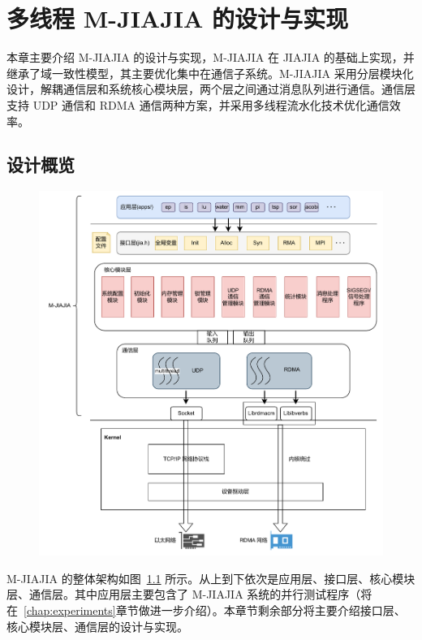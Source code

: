 \chapter{多线程 M-JIAJIA 的设计与实现}\label{chap:MJIAJIA}{
    本章主要介绍 M-JIAJIA 的设计与实现，M-JIAJIA 在 JIAJIA 的基础上实现，并继承了域一致性模型，其主要优化集中在通信子系统。M-JIAJIA 采用分层模块化设计，解耦通信层和系统核心模块层，两个层之间通过消息队列进行通信。通信层支持 UDP 通信和 RDMA 通信两种方案，并采用多线程流水化技术优化通信效率。

    \section{设计概览}
    \begin{figure}[!htbp]
        \centering
        \includegraphics[width=1.0\textwidth]{Img/MJIAJIA系统框架图.drawio.pdf}
        \label{fig:system-arch}
    \end{figure}
    M-JIAJIA 的整体架构如图~\ref{fig:system-arch} 所示。从上到下依次是应用层、接口层、核心模块层、通信层。其中应用层主要包含了 M-JIAJIA 系统的并行测试程序（将在~\ref{chap:experiments}章节做进一步介绍）。本章节剩余部分将主要介绍接口层、核心模块层、通信层的设计与实现。

}

